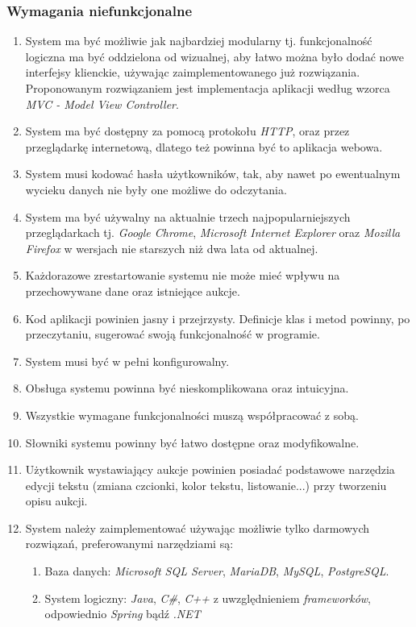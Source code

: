 \documentclass[10pt,titlepage]{article} %
\begin{document}
\subsubsection{Wymagania niefunkcjonalne}
\begin{enumerate}[1.]
\item System ma być możliwie jak najbardziej modularny tj. funkcjonalność logiczna ma być oddzielona od wizualnej, aby łatwo można było dodać nowe interfejsy klienckie, używając zaimplementowanego już rozwiązania. Proponowanym rozwiązaniem jest implementacja aplikacji według wzorca \textit{MVC - Model View Controller}.
\item System ma być dostępny za pomocą protokołu \textit{HTTP}, oraz przez przeglądarkę internetową, dlatego też powinna być to aplikacja webowa.
\item System musi kodować hasła użytkowników, tak, aby nawet po ewentualnym wycieku danych nie były one możliwe do odczytania.
\item System ma być używalny na aktualnie trzech najpopularniejszych przeglądarkach tj. \textit{Google Chrome}, \textit{Microsoft Internet Explorer} oraz \textit{Mozilla Firefox} w wersjach nie starszych niż dwa lata od aktualnej.
\item Każdorazowe zrestartowanie systemu nie może mieć wpływu na przechowywane dane oraz istniejące aukcje.
\item Kod aplikacji powinien jasny i przejrzysty. Definicje klas i metod powinny, po przeczytaniu, sugerować swoją funkcjonalność w programie. 
\item System musi być w pełni konfigurowalny.
\item Obsługa systemu powinna być nieskomplikowana oraz intuicyjna.
\item Wszystkie wymagane funkcjonalności muszą współpracować z sobą.
\item Słowniki systemu powinny być łatwo dostępne oraz modyfikowalne.
\item Użytkownik wystawiający aukcje powinien posiadać podstawowe narzędzia edycji tekstu (zmiana czcionki, kolor tekstu, listowanie...) przy tworzeniu opisu aukcji.
\item System należy zaimplementować używając możliwie tylko darmowych rozwiązań, preferowanymi narzędziami są:
\begin{enumerate}
\item Baza danych: \textit{Microsoft SQL Server}, \textit{MariaDB}, \textit{MySQL}, \textit{PostgreSQL}.
\item System logiczny: \textit{Java}, \textit{C\#}, \textit{C++} z uwzględnieniem \textit{frameworków}, odpowiednio \textit{Spring} bądź \textit{.NET}

\end{enumerate}
\end{enumerate}
\end{document}
